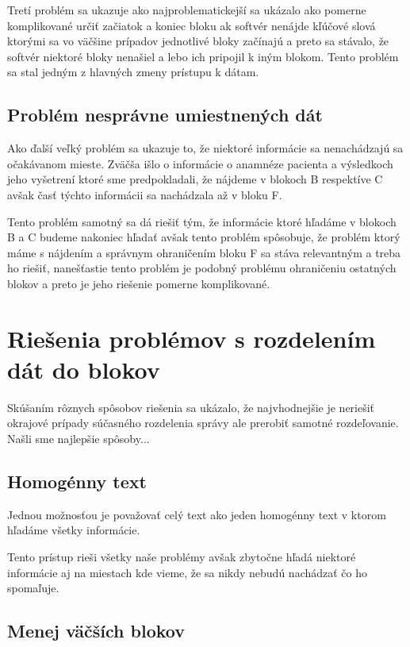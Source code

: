 Tretí problém sa ukazuje ako najproblematickejší sa ukázalo ako pomerne komplikované určiť začiatok a koniec bloku ak softvér nenájde kľúčové slová ktorými sa vo väčšine prípadov jednotlivé bloky začínajú a preto sa stávalo, že softvér niektoré bloky nenašiel a lebo ich pripojil k iným blokom. Tento problém sa stal jedným z hlavných zmeny prístupu k dátam.

\subsection{Problém nesprávne umiestnených dát}

Ako ďalší veľký problém sa ukazuje to, že niektoré informácie sa nenachádzajú sa očakávanom mieste. Zväčša išlo o informácie o anamnéze pacienta a výsledkoch jeho vyšetrení ktoré sme predpokladali, že nájdeme v blokoch B respektíve C avšak časť týchto informácii sa nachádzala až v bloku F.

Tento problém samotný sa dá riešiť tým, že informácie ktoré hľadáme v blokoch B a C budeme nakoniec hľadať avšak tento problém spôsobuje, že problém ktorý máme s nájdením a správnym ohraničením bloku F sa stáva relevantným a treba ho riešiť, nanešťastie tento problém je podobný problému ohraničeniu ostatných blokov a preto je jeho riešenie pomerne komplikované.

\section{Riešenia problémov s rozdelením dát do blokov}

Skúšaním rôznych spôsobov riešenia sa ukázalo, že najvhodnejšie je neriešiť okrajové prípady súčasného rozdelenia správy ale prerobiť samotné rozdeľovanie. {Našli sme najlepšie spôsoby...}

\subsection{Homogénny text}

Jednou možnosťou je považovať celý text ako jeden homogénny text v ktorom hľadáme všetky informácie.

Tento prístup rieši všetky naše problémy avšak zbytočne hľadá niektoré informácie aj na miestach kde vieme, že sa nikdy nebudú nachádzať čo ho spomaľuje.

\subsection{Menej väčších blokov}

